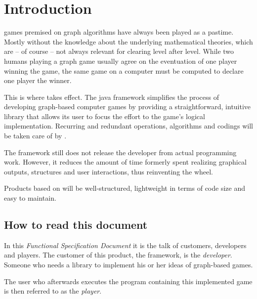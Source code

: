 \section{Introduction}
\Glspl{game} premised on \gls{graph} \glspl{algorithm} have always been played as a pastime. Mostly without the knowledge about the underlying mathematical theories, which are – of course – not always relevant for clearing \gls{level} after level. While two humans playing a graph game usually agree on the eventuation of one player winning the game, the same game on a computer must be computed to declare one \gls{player} the winner.\par

This is where {\graphioli} takes effect. The \Gls{java} \gls{framework} simplifies the process of developing graph-based computer games by providing a straightforward, intuitive \gls{library} that allows its user to focus the effort to the game's logical implementation. Recurring and redundant operations, algorithms and codings will be taken care of by {\graphioli}.\par

The framework still does not release the \gls{developer} from actual programming work. However, it reduces the amount of time formerly spent realizing graphical outputs, structures and user interactions, thus reinventing the wheel.\par

Products based on {\graphioli} will be well-structured, lightweight in terms of code size and easy to maintain.\par

\subsection{How to read this document}

In this \emph{Functional Specification Document} it is the talk of \glspl{customer}, \glspl{developer} and \glspl{player}. The customer of this product, the {\graphioli} framework, is the \emph{developer}. Someone who needs a library to implement his or her ideas of graph-based \glspl{game}.\par
The user who afterwards executes the program containing this implemented game is then referred to as the \emph{player}.